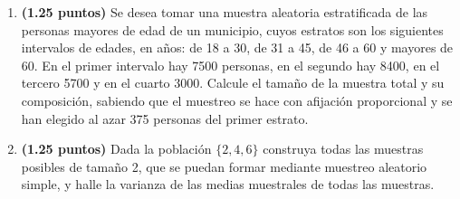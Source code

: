
\begin{enumerate}[label=\alph*)]
\item \textbf{(1.25 puntos)} Se desea tomar una muestra aleatoria estratificada de las personas mayores de edad de un municipio, cuyos estratos son los siguientes intervalos de edades, en años: de 18 a 30, de 31 a 45, de 46 a 60 y mayores de 60. En el primer intervalo hay 7500 personas, en el segundo hay 8400, en el tercero 5700 y en el cuarto 3000. Calcule el tamaño de la muestra total y su composición, sabiendo que el muestreo se hace con afijación proporcional y se han elegido al azar 375 personas del primer estrato.
\item \textbf{(1.25 puntos)} Dada la población $\{2,4,6\}$ construya todas las muestras posibles de tamaño 2, que se puedan formar mediante muestreo aleatorio simple, y halle la varianza de las medias muestrales de todas las muestras.
\end{enumerate}
